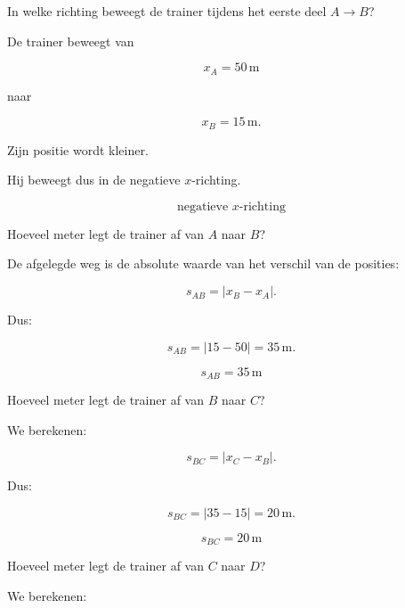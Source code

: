 \documentclass{ximera}
\begin{document}
\begin{oefening}{\oefU}
  
  \begin{question}
  In welke richting beweegt de trainer tijdens het eerste deel
  $A\rightarrow B$?
  
  \begin{oplossing}
  De trainer beweegt van
  
  \[
  x_A=50\,\mathrm{m}
  \]
  
  naar
  
  \[
  x_B=15\,\mathrm{m}.
  \]
  
  Zijn positie wordt kleiner.
  
  Hij beweegt dus in de negatieve $x$-richting.
  
  \[
  \boxed{\text{negatieve }x\text{-richting}}
  \]
  \end{oplossing}
  \end{question}
  
  
  \begin{question}
  Hoeveel meter legt de trainer af van $A$ naar $B$?
  
  \begin{oplossing}
  De afgelegde weg is de absolute waarde van het verschil van de posities:
  
  \[
  s_{AB}
  =
  |x_B-x_A|.
  \]
  
  Dus:
  
  \[
  s_{AB}
  =
  |15-50|
  =
  35\,\mathrm{m}.
  \]
  
  \[
  \boxed{s_{AB}=35\,\mathrm{m}}
  \]
  \end{oplossing}
  \end{question}
  
  
  \begin{question}
  Hoeveel meter legt de trainer af van $B$ naar $C$?
  
  \begin{oplossing}
  We berekenen:
  
  \[
  s_{BC}
  =
  |x_C-x_B|.
  \]
  
  Dus:
  
  \[
  s_{BC}
  =
  |35-15|
  =
  20\,\mathrm{m}.
  \]
  
  \[
  \boxed{s_{BC}=20\,\mathrm{m}}
  \]
  \end{oplossing}
  \end{question}
  
  
  \begin{question}
  Hoeveel meter legt de trainer af van $C$ naar $D$?
  
  \begin{oplossing}
  We berekenen:
  

\end{oplossing}
\end{question}
\end{oefening}
\end{document}
